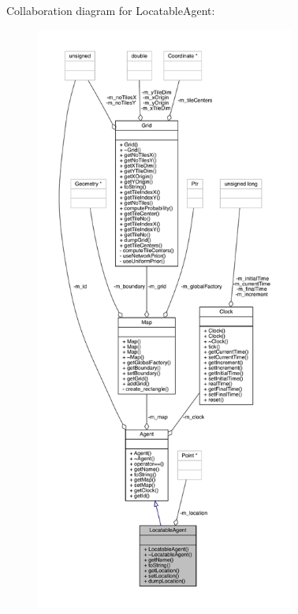 Collaboration diagram for Locatable\+Agent\+:\nopagebreak
\begin{figure}[H]
\begin{center}
\leavevmode
\includegraphics[height=550pt]{class_locatable_agent__coll__graph}
\end{center}
\end{figure}
